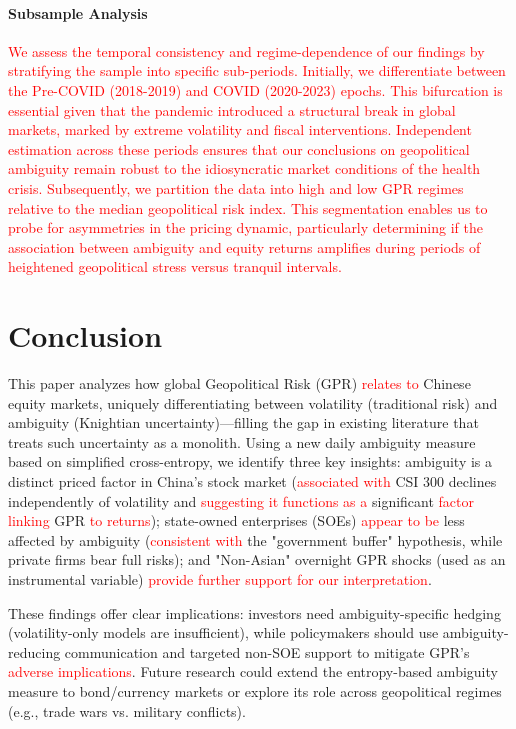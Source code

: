 \documentclass[preprint,12pt,authoryear]{elsarticle}
\begin{document}
\paragraph{Subsample Analysis} \textcolor{red}{We assess the temporal consistency and regime-dependence of our findings by stratifying the sample into specific sub-periods. Initially, we differentiate between the Pre-COVID (2018-2019) and COVID (2020-2023) epochs. This bifurcation is essential given that the pandemic introduced a structural break in global markets, marked by extreme volatility and fiscal interventions. Independent estimation across these periods ensures that our conclusions on geopolitical ambiguity remain robust to the idiosyncratic market conditions of the health crisis. Subsequently, we partition the data into high and low GPR regimes relative to the median geopolitical risk index. This segmentation enables us to probe for asymmetries in the pricing dynamic, particularly determining if the \textcolor{red}{association between} ambiguity \textcolor{red}{and} equity returns amplifies during periods of heightened geopolitical stress versus tranquil intervals.}


\section{Conclusion}
\label{sec:conclusion}

This paper analyzes how global Geopolitical Risk (GPR) \textcolor{red}{relates to} Chinese equity markets, uniquely differentiating between volatility (traditional risk) and ambiguity (Knightian uncertainty)—filling the gap in existing literature that treats such uncertainty as a monolith. Using a new daily ambiguity measure based on simplified cross-entropy, we identify three key insights: ambiguity is a distinct priced factor in China’s stock market (\textcolor{red}{associated with} CSI 300 declines independently of volatility and \textcolor{red}{suggesting it functions as a} significant \textcolor{red}{factor linking} GPR \textcolor{red}{to returns}); state-owned enterprises (SOEs) \textcolor{red}{appear to be} less affected by ambiguity (\textcolor{red}{consistent with} the "government buffer" hypothesis, while private firms bear full risks); and "Non-Asian" overnight GPR shocks (used as an instrumental variable) \textcolor{red}{provide further support for our interpretation}.

These findings offer clear implications: investors need ambiguity-specific hedging (volatility-only models are insufficient), while policymakers should use ambiguity-reducing communication and targeted non-SOE support to mitigate GPR’s \textcolor{red}{adverse implications}. Future research could extend the entropy-based ambiguity measure to bond/currency markets or explore its role across geopolitical regimes (e.g., trade wars vs. military conflicts).
\end{document}
